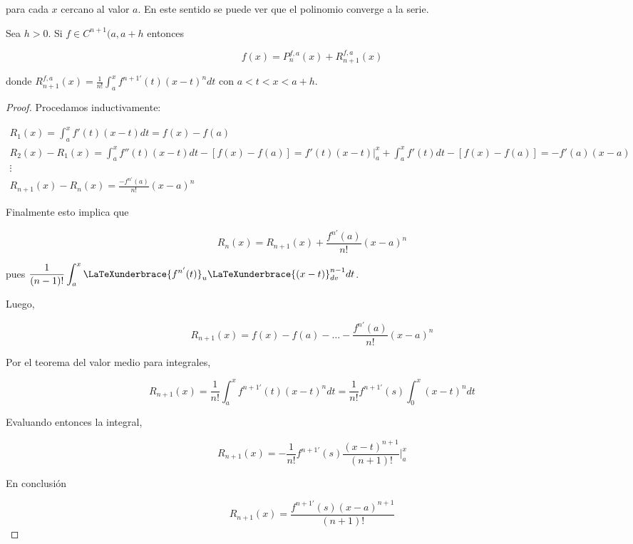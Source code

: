\noindent para cada $x$ cercano al valor $a$. En este sentido se puede ver que el polinomio converge a la serie.

\begin{teo}
    Sea $h>0$. Si $f \in C^{n+1}(a,a+h$ entonces
    
    \[
    f(x) = P_n^{f,a}(x) + R_{n+1}^{f,a}(x)
    \]
    
    \noindent donde $\displaystyle R_{n+1}^{f,a}(x) = \frac{1}{n!} \int_a^x f^{n+1'}(t)(x-t)^ndt$ con $a < t < x < a+h$.
\end{teo}

\begin{proof}
    Procedamos inductivamente:
    
    \begin{gather*}
        R_1(x) = \int_a^x f'(t)(x-t)dt = f(x) - f(a) \\
        R_2(x) - R_1(x) = \int_a^x f''(t)(x-t)dt - [f(x) - f(a)] = f'(t) (x-t)|_a^x + \int_a^x f'(t)dt - [f(x) - f(a)] = -f'(a)(x-a) \\
        \vdots \\
        R_{n+1}(x) - R_n(x) = \frac{-f^{n'}(a)}{n!}(x-a)^n
    \end{gather*}
    
    Finalmente esto implica que
    
    \[
    R_n(x) = R_{n+1}(x) + \frac{f^{n'}(a)}{n!}(x-a)^n
    \]
    
    \noindent pues $\displaystyle \frac{1}{(n-1)!} \int_a^x \LaTeXunderbrace{f^{n'}(t)}_u \LaTeXunderbrace{(x-t)}_{dv}^{n-1}dt$.
    
    Luego,
    
    \[
    R_{n+1}(x) = f(x) - f(a) - \dots - \frac{f^{n'}(a)}{n!}(x-a)^n
    \]
    
    Por el teorema del valor medio para integrales,
    
    \[
    R_{n+1}(x) = \frac{1}{n!} \int_a^x f^{n+1'}(t)(x-t)^ndt = \frac{1}{n!}f^{n+1'}(s) \int_0^x(x-t)^ndt
    \]
    
    Evaluando entonces la integral,
    
    \[
    R_{n+1}(x) = -\frac{1}{n!}f^{n+1'}(s)\frac{(x-t)^{n+1}}{(n+1)!} |_a^x
    \]
    
    En conclusión
    
    \[
    R_{n+1}(x) = \frac{f^{n+1'}(s)(x-a)^{n+1}}{(n+1)!}
    \]
\end{proof}